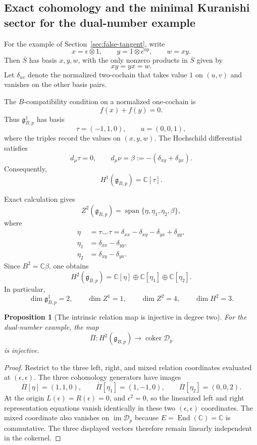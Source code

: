 \documentclass[11pt]{amsart}
\newtheorem{proposition}[theorem]{Proposition}
\newcommand{\End}{\operatorname{End}}
\newcommand{\Span}{\operatorname{span}}
\newcommand{\coker}{\operatorname{coker}}
\newcommand{\cD}{\mathscr D}
\newcommand{\C}{\mathbb C}
\newcommand{\ghoch}{\mathfrak g}
\begin{document}
\subsection{Exact cohomology and the minimal Kuranishi sector for the dual-number example}

For the example of Section~\ref{sec:false-tangent}, write
\[
x=\epsilon\otimes1,
\qquad
y=1\otimes\epsilon^{\mathrm{op}},
\qquad
w=xy.
\]
Then $\overline S$ has basis $x,y,w$, with the only nonzero products in $\overline S$ given by
\[
xy=yx=w.
\]
Let $\delta_{uv}$ denote the normalized two-cochain that takes value $1$ on $(u,v)$ and vanishes on the other basis pairs.

The $B$-compatibility condition on a normalized one-cochain is
\[
f(x)+f(y)=0.
\]
Thus $\ghoch^1_{B,p}$ has basis
\[
\tau=(-1,1,0),
\qquad
u=(0,0,1),
\]
where the triples record the values on $(x,y,w)$.  The Hochschild differential satisfies
\[
d_\mu\tau=0,
\qquad
d_\mu\nu=\beta:=-(\delta_{xy}+\delta_{yx}).
\]
Consequently,
\[
H^1(\ghoch_{B,p})=\C[\tau].
\]

Exact calculation gives
\[
Z^2(\ghoch_{B,p})
=
\Span\{\eta,\eta_1,\eta_2,\beta\},
\]
where
\begin{align*}
\eta&=\tau\smile\tau
=\delta_{xx}-\delta_{xy}-\delta_{yx}+\delta_{yy},\\
\eta_1&=\delta_{xx}-\delta_{yy},\\
\eta_2&=\delta_{xy}-\delta_{yx}.
\end{align*}
Since $B^2=\C\beta$, one obtains
\[
H^2(\ghoch_{B,p})
=
\C[\eta]\oplus\C[\eta_1]\oplus\C[\eta_2].
\]
In particular,
\[
\dim\ghoch^1_{B,p}=2,
\qquad
\dim Z^1=1,
\qquad
\dim Z^2=4,
\qquad
\dim H^2=3.
\]

\begin{proposition}[The intrinsic relation map is injective in degree two]\label{prop:dual-h2-injective}
For the dual-number example, the map
\[
\overline\Pi:H^2(\ghoch_{B,p})\longrightarrow\coker\cD_p
\]
is injective.
\end{proposition}

\begin{proof}
Restrict to the three left, right, and mixed relation coordinates evaluated at $(\epsilon,\epsilon)$.  The three cohomology generators have images
\[
\overline\Pi[\eta]=(1,1,0),
\qquad
\overline\Pi[\eta_1]=(1,-1,0),
\qquad
\overline\Pi[\eta_2]=(0,0,2).
\]
At the origin $L(\epsilon)=R(\epsilon)=0$, and $\epsilon^2=0$, so the linearized left and right representation equations vanish identically in these two $(\epsilon,\epsilon)$ coordinates.  The mixed coordinate also vanishes on $\operatorname{im}\cD_p$ because $E=\End(\C)=\C$ is commutative.  The three displayed vectors therefore remain linearly independent in the cokernel.
\end{proof}
\end{document}
